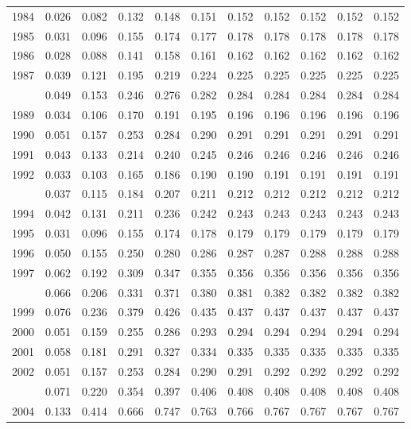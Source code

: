 \documentclass[
]{article}
\begin{document}
\begin{longtable}[t]{lrrrrrrrrrr}
1984 & 0.026 & 0.082 & 0.132 & 0.148 & 0.151 & 0.152 & 0.152 & 0.152 & 0.152 & 0.152\\
1985 & 0.031 & 0.096 & 0.155 & 0.174 & 0.177 & 0.178 & 0.178 & 0.178 & 0.178 & 0.178\\
1986 & 0.028 & 0.088 & 0.141 & 0.158 & 0.161 & 0.162 & 0.162 & 0.162 & 0.162 & 0.162\\
1987 & 0.039 & 0.121 & 0.195 & 0.219 & 0.224 & 0.225 & 0.225 & 0.225 & 0.225 & 0.225\\
\addlinespace
1988 & 0.049 & 0.153 & 0.246 & 0.276 & 0.282 & 0.284 & 0.284 & 0.284 & 0.284 & 0.284\\
1989 & 0.034 & 0.106 & 0.170 & 0.191 & 0.195 & 0.196 & 0.196 & 0.196 & 0.196 & 0.196\\
1990 & 0.051 & 0.157 & 0.253 & 0.284 & 0.290 & 0.291 & 0.291 & 0.291 & 0.291 & 0.291\\
1991 & 0.043 & 0.133 & 0.214 & 0.240 & 0.245 & 0.246 & 0.246 & 0.246 & 0.246 & 0.246\\
1992 & 0.033 & 0.103 & 0.165 & 0.186 & 0.190 & 0.190 & 0.191 & 0.191 & 0.191 & 0.191\\
\addlinespace
1993 & 0.037 & 0.115 & 0.184 & 0.207 & 0.211 & 0.212 & 0.212 & 0.212 & 0.212 & 0.212\\
1994 & 0.042 & 0.131 & 0.211 & 0.236 & 0.242 & 0.243 & 0.243 & 0.243 & 0.243 & 0.243\\
1995 & 0.031 & 0.096 & 0.155 & 0.174 & 0.178 & 0.179 & 0.179 & 0.179 & 0.179 & 0.179\\
1996 & 0.050 & 0.155 & 0.250 & 0.280 & 0.286 & 0.287 & 0.287 & 0.288 & 0.288 & 0.288\\
1997 & 0.062 & 0.192 & 0.309 & 0.347 & 0.355 & 0.356 & 0.356 & 0.356 & 0.356 & 0.356\\
\addlinespace
1998 & 0.066 & 0.206 & 0.331 & 0.371 & 0.380 & 0.381 & 0.382 & 0.382 & 0.382 & 0.382\\
1999 & 0.076 & 0.236 & 0.379 & 0.426 & 0.435 & 0.437 & 0.437 & 0.437 & 0.437 & 0.437\\
2000 & 0.051 & 0.159 & 0.255 & 0.286 & 0.293 & 0.294 & 0.294 & 0.294 & 0.294 & 0.294\\
2001 & 0.058 & 0.181 & 0.291 & 0.327 & 0.334 & 0.335 & 0.335 & 0.335 & 0.335 & 0.335\\
2002 & 0.051 & 0.157 & 0.253 & 0.284 & 0.290 & 0.291 & 0.292 & 0.292 & 0.292 & 0.292\\
\addlinespace
2003 & 0.071 & 0.220 & 0.354 & 0.397 & 0.406 & 0.408 & 0.408 & 0.408 & 0.408 & 0.408\\
2004 & 0.133 & 0.414 & 0.666 & 0.747 & 0.763 & 0.766 & 0.767 & 0.767 & 0.767 & 0.767\\

\end{longtable}
\end{document}
